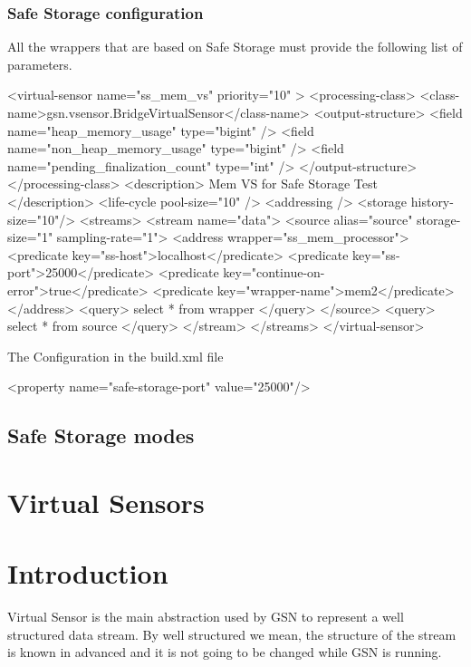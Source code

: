 \subsubsection{Safe Storage configuration}

All the wrappers that are based on Safe Storage must provide the following list of parameters.



\begin{xmlcode}[caption={Sample of Email Notification VSD file}, label=listing:xml:safestorage_vsd]
<virtual-sensor name="ss_mem_vs" priority="10" >
	<processing-class>
		<class-name>gsn.vsensor.BridgeVirtualSensor</class-name>
		<output-structure>
			<field name="heap_memory_usage" type="bigint" />
			<field name="non_heap_memory_usage" type="bigint" />
			<field name="pending_finalization_count" type="int" />
		</output-structure>
	</processing-class>
	<description> Mem VS for Safe Storage Test </description>
	<life-cycle pool-size="10" />
	<addressing />
	<storage history-size="10"/>
	<streams>
		<stream name="data">
			<source alias="source" storage-size="1" sampling-rate="1">
				<address wrapper="ss_mem_processor">
					<predicate key="ss-host">localhost</predicate>
					<predicate key="ss-port">25000</predicate>
					<predicate key="continue-on-error">true</predicate>
					<predicate key="wrapper-name">mem2</predicate>
				</address>
				<query> select * from wrapper </query>
			</source>
			<query> select * from source </query>
		</stream>
	</streams>
</virtual-sensor>
\end{xmlcode}


The Configuration in the build.xml file

<property name="safe-storage-port" value="25000"/>

\subsection{Safe Storage modes}

\section{Virtual Sensors}
\section{Introduction}
Virtual Sensor is the main abstraction used by GSN to represent a well structured data stream.
By well structured we mean, the structure of the stream is known in advanced and it is not going to be changed
while GSN is running.
